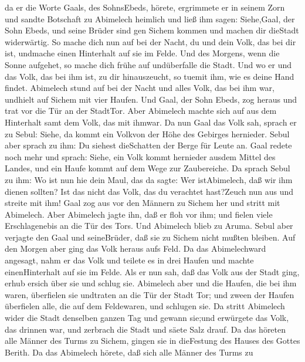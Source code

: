 da er die Worte Gaals, des SohnsEbeds, hörete, ergrimmete er in seinem
Zorn  und sandte Botschaft zu Abimelech heimlich und ließ
ihm sagen: Siehe,Gaal, der Sohn Ebeds, und seine Brüder sind gen Sichem
kommen und machen dir dieStadt widerwärtig.  So mache dich
nun auf bei der Nacht, du und dein Volk, das bei dir ist, undmache einen
Hinterhalt auf sie im Felde.  Und des Morgens, wenn die
Sonne aufgehet, so mache dich frühe auf undüberfalle die Stadt. Und wo
er und das Volk, das bei ihm ist, zu dir hinauszeucht, so tuemit ihm,
wie es deine Hand findet.  Abimelech stund auf bei der
Nacht und alles Volk, das bei ihm war, undhielt auf Sichem mit vier
Haufen.  Und Gaal, der Sohn Ebeds, zog heraus und trat vor
die Tür an der StadtTor. Aber Abimelech machte sich auf aus dem
Hinterhalt samt dem Volk, das mit ihmwar.  Da nun Gaal das
Volk sah, sprach er zu Sebul: Siehe, da kommt ein Volkvon der Höhe des
Gebirges hernieder. Sebul aber sprach zu ihm: Du siehest dieSchatten der
Berge für Leute an.  Gaal redete noch mehr und sprach:
Siehe, ein Volk kommt hernieder ausdem Mittel des Landes, und ein Haufe
kommt auf dem Wege zur Zaubereiche.  Da sprach Sebul zu
ihm: Wo ist nun hie dein Maul, das da sagte: Wer istAbimelech, daß wir
ihm dienen sollten? Ist das nicht das Volk, das du verachtet hast?Zeuch
nun aus und streite mit ihm!  Gaal zog aus vor den Männern
zu Sichem her und stritt mit Abimelech.  Aber Abimelech
jagte ihn, daß er floh vor ihm; und fielen viele Erschlagenebis an die
Tür des Tors.  Und Abimelech blieb zu Aruma. Sebul aber
verjagte den Gaal und seineBrüder, daß sie zu Sichem nicht mußten
bleiben.  Auf den Morgen aber ging das Volk heraus aufs
Feld. Da das Abimelechward angesagt,  nahm er das Volk und
teilete es in drei Haufen und machte einenHinterhalt auf sie im Felde.
Als er nun sah, daß das Volk aus der Stadt ging, erhub ersich über sie
und schlug sie.  Abimelech aber und die Haufen, die bei ihm
waren, überfielen sie undtraten an die Tür der Stadt Tor; und zween der
Haufen überfielen alle, die auf dem Feldewaren, und schlugen sie.
 Da stritt Abimelech wider die Stadt denselben ganzen Tag
und gewann sie;und erwürgete das Volk, das drinnen war, und zerbrach die
Stadt und säete Salz drauf.  Da das höreten alle Männer des
Turms zu Sichem, gingen sie in dieFestung des Hauses des Gottes Berith.
 Da das Abimelech hörete, daß sich alle Männer des Turms zu
